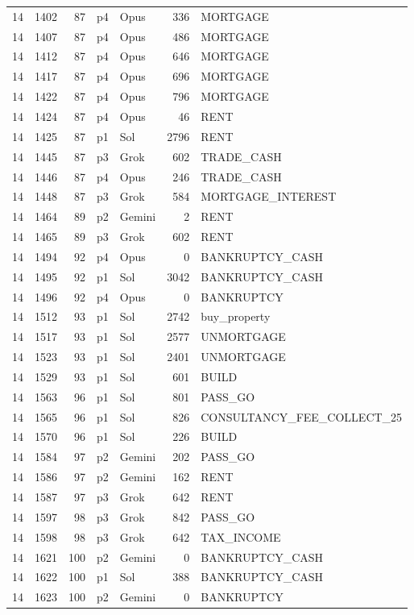 \begin{longtable}{r r r l l r L{2.2in}}
14 & 1402 & 87 & p4 & Opus & 336 & MORTGAGE \\
14 & 1407 & 87 & p4 & Opus & 486 & MORTGAGE \\
14 & 1412 & 87 & p4 & Opus & 646 & MORTGAGE \\
14 & 1417 & 87 & p4 & Opus & 696 & MORTGAGE \\
14 & 1422 & 87 & p4 & Opus & 796 & MORTGAGE \\
14 & 1424 & 87 & p4 & Opus & 46 & RENT \\
14 & 1425 & 87 & p1 & Sol & 2796 & RENT \\
14 & 1445 & 87 & p3 & Grok & 602 & TRADE\_CASH \\
14 & 1446 & 87 & p4 & Opus & 246 & TRADE\_CASH \\
14 & 1448 & 87 & p3 & Grok & 584 & MORTGAGE\_INTEREST \\
14 & 1464 & 89 & p2 & Gemini & 2 & RENT \\
14 & 1465 & 89 & p3 & Grok & 602 & RENT \\
14 & 1494 & 92 & p4 & Opus & 0 & BANKRUPTCY\_CASH \\
14 & 1495 & 92 & p1 & Sol & 3042 & BANKRUPTCY\_CASH \\
14 & 1496 & 92 & p4 & Opus & 0 & BANKRUPTCY \\
14 & 1512 & 93 & p1 & Sol & 2742 & buy\_property \\
14 & 1517 & 93 & p1 & Sol & 2577 & UNMORTGAGE \\
14 & 1523 & 93 & p1 & Sol & 2401 & UNMORTGAGE \\
14 & 1529 & 93 & p1 & Sol & 601 & BUILD \\
14 & 1563 & 96 & p1 & Sol & 801 & PASS\_GO \\
14 & 1565 & 96 & p1 & Sol & 826 & CONSULTANCY\_FEE\_COLLECT\_25 \\
14 & 1570 & 96 & p1 & Sol & 226 & BUILD \\
14 & 1584 & 97 & p2 & Gemini & 202 & PASS\_GO \\
14 & 1586 & 97 & p2 & Gemini & 162 & RENT \\
14 & 1587 & 97 & p3 & Grok & 642 & RENT \\
14 & 1597 & 98 & p3 & Grok & 842 & PASS\_GO \\
14 & 1598 & 98 & p3 & Grok & 642 & TAX\_INCOME \\
14 & 1621 & 100 & p2 & Gemini & 0 & BANKRUPTCY\_CASH \\
14 & 1622 & 100 & p1 & Sol & 388 & BANKRUPTCY\_CASH \\
14 & 1623 & 100 & p2 & Gemini & 0 & BANKRUPTCY \\

\end{longtable}
